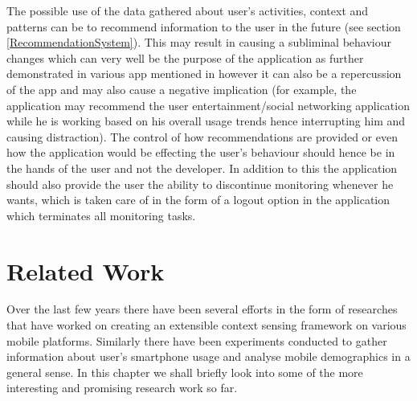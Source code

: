 \documentclass[12pt]{report}
\begin{document}
The possible use of the data gathered about user's activities, context and patterns can be to recommend information to the user in the future (see section \ref{RecommendationSystem}). This may result in causing a subliminal behaviour changes which can very well be the purpose of the application as further demonstrated in various app mentioned in \cite{lathia2013smartphones} however it can also be a repercussion of the app and may also cause a negative implication (for example, the application may recommend the user entertainment/social networking application while he is working based on his overall usage trends hence interrupting him and causing distraction). The control of how recommendations are provided or even how the application would be effecting the user's behaviour should hence be in the hands of the user and not the developer. In addition to this the application should also provide the user the ability to discontinue monitoring whenever he wants, which is taken care of in the form of a logout option in the application which terminates all monitoring tasks.

\chapter{Related Work}
Over the last few years there have been several efforts in the form of researches that have worked on creating an extensible context sensing framework on various mobile platforms. Similarly there have been experiments conducted to gather information about user's smartphone usage and analyse mobile demographics in a general sense. In this chapter we shall briefly look into some of the more interesting and promising research work so far.
\end{document}
